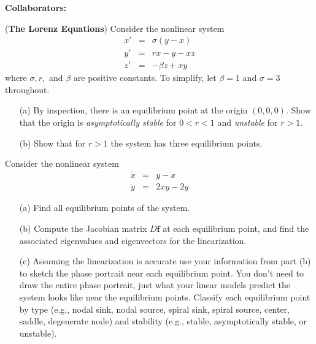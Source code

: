 \documentclass[11pt,letterpaper,boxed]{hmcpset}
\begin{document}
\noindent\textbf{Collaborators:} 



\begin{problem}[1.] ({\bf The Lorenz Equations}) Consider the  nonlinear system
\begin{eqnarray*}
x' & = & \sigma ( y - x) \\
y' & = & r x - y - x z \\
z'  & = & -\beta z + x y
\end{eqnarray*}
where $\sigma,  r,$ and $\beta$ are positive constants. To simplify, let $\beta=1$ and $\sigma=3$ throughout.

\begin{enumerate}
\item[(a)] By inspection, there is an equilibrium point at the origin $(0,0,0)$.  Show that the 
origin is {\it asymptotically stable} for $0<r<1$ and {\it unstable} for $r>1$. 
\item[(b)]Show that for $r>1$ the system has three equilibrium points. \end{enumerate}
\end{problem}

\begin{solution}
\vfill
\end{solution}
\newpage

\begin{problem}[2.]  Consider the nonlinear  system
\begin{eqnarray*}
\dot{x} & =& y-x \\
\dot{y} &=& 2xy-2y 
\end{eqnarray*}
\begin{itemize}
\item[(a)] Find all equilibrium points of the system. 
\item[(b)] Compute the Jacobian matrix $D\mathbf{f}$ at each equilibrium point, and find the associated eigenvalues and eigenvectors for the linearization. 
\item[(c)]  Assuming the linearization is accurate use your information from part (b) to sketch the phase portrait near each equilibrium point. You don't need to draw the entire phase portrait, just what your linear models predict the system looks like near the equilibrium points.   Classify each equilibrium point by type (e.g., nodal sink, nodal source, spiral sink, spiral source, center, saddle, degenerate node) and stability (e.g., stable, asymptotically stable, or unstable).
\end{itemize}
\end{problem}
\end{document}
